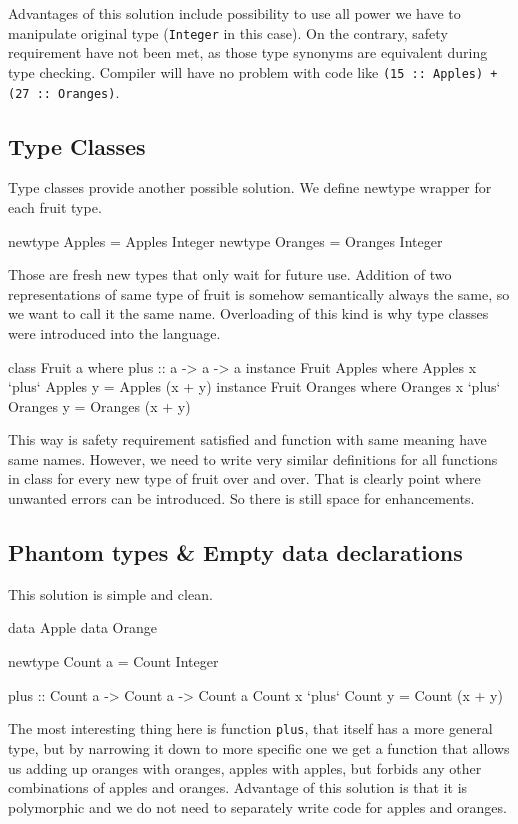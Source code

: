 \documentclass[11pt,oneside,draft]{fithesis2}
\begin{document}
Advantages of this solution include possibility to use all power we have
to manipulate original type (\texttt{Integer} in this case). On the contrary,
safety requirement have not been met, as those type synonyms are equivalent
during type checking. Compiler will have no problem with
code like \texttt{(15 :: Apples) + (27 :: Oranges)}.

\subsection{Type Classes}

Type classes provide another possible solution. We define newtype wrapper
for each fruit type.
\begin{code}
newtype Apples  = Apples  Integer
newtype Oranges = Oranges Integer
\end{code}

Those are fresh new types that only wait for future use.
Addition of two representations of same type of fruit is somehow semantically
always the same, so we want to call it the same name. Overloading of this kind is why
type classes were introduced into the language.
\begin{code}
class Fruit a where
    plus :: a -> a -> a
instance Fruit Apples where
	Apples x `plus` Apples y = Apples (x + y)
instance Fruit Oranges where
	Oranges x `plus` Oranges y = Oranges (x + y)
\end{code}

This way is safety requirement satisfied and function
with same meaning have same names. However, we need to write
very similar definitions for all functions in class
for every new type of fruit over and over. That is clearly
point where unwanted errors can be introduced. So there is still
space for enhancements.


\subsection{Phantom types \& Empty data declarations}

This solution is simple and clean.
\begin{code}
data Apple
data Orange

newtype Count a = Count Integer

plus :: Count a -> Count a -> Count a
Count x `plus` Count y = Count (x + y)
\end{code}
The most interesting thing here is function \texttt{plus}, that itself has a more general type, but
by narrowing it down to more specific one we get a function that allows us
adding up oranges with oranges, apples with apples, but forbids any other combinations
of apples and oranges. Advantage of this solution is that it is polymorphic
and we do not need to separately write code for apples and oranges.
\end{document}
